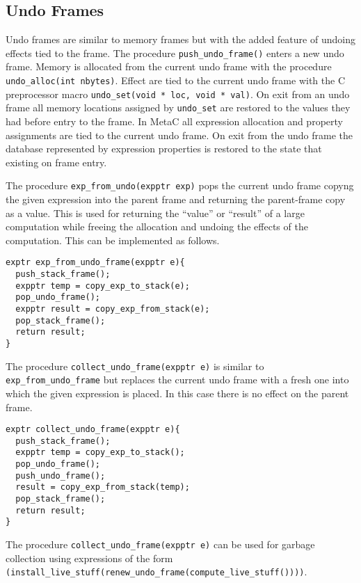 \documentclass{article}
\begin{document}
\subsection{Undo Frames}
Undo frames are similar to memory frames but with the added feature of undoing effects tied to the frame.
The procedure {\tt push\_undo\_frame()} enters a new undo frame.
Memory is allocated from the current undo frame
with the procedure {\tt undo\_alloc(int nbytes)}.  Effect are tied to the current undo frame with the C preprocessor macro
{\tt undo\_set(void * loc, void * val)}.  On exit from an undo frame all memory locations assigned by {\tt undo\_set} are restored to the values
they had before entry to the frame.
In MetaC all expression allocation and property assignments are tied to the current undo frame.
On exit from the undo frame the database represented by expression properties is restored to
the state that existing on frame entry.

The procedure {\tt exp\_from\_undo(expptr exp)} pops the current
undo frame copyng the given expression into the parent frame and returning the parent-frame copy as a value.
This is used for returning the ``value'' or ``result'' of a large computation while freeing the allocation and undoing the effects of the computation.
This can be implemented as follows.

\begin{verbatim}
exptr exp_from_undo_frame(expptr e){
  push_stack_frame();
  expptr temp = copy_exp_to_stack(e);
  pop_undo_frame();
  expptr result = copy_exp_from_stack(e);
  pop_stack_frame();
  return result;
}
\end{verbatim}

The procedure {\tt collect\_undo\_frame(expptr e)} is similar to {\tt exp\_from\_undo\_frame} but replaces the current undo frame with a fresh one
into which the given expression is placed.  In this case there is no effect on the parent frame.

\begin{verbatim}
exptr collect_undo_frame(expptr e){
  push_stack_frame();
  expptr temp = copy_exp_to_stack();
  pop_undo_frame();
  push_undo_frame();
  result = copy_exp_from_stack(temp);
  pop_stack_frame();
  return result; 
}
\end{verbatim}

The procedure {\tt collect\_undo\_frame(expptr e)} can be used for garbage collection using
expressions of the form {\tt (install\_live\_stuff(renew\_undo\_frame(compute\_live\_stuff())))}.
\end{document}
